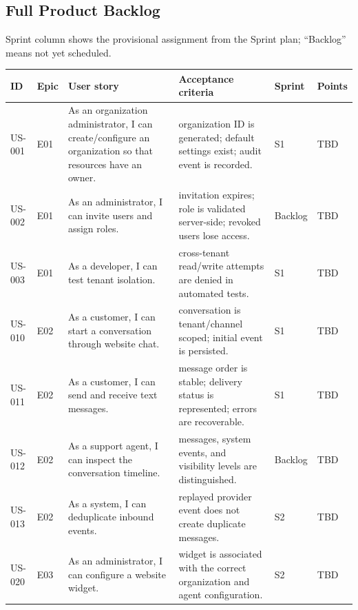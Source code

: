 \begin{lscapepage}
\section{Full Product Backlog}
Sprint column shows the provisional assignment from the Sprint plan; ``Backlog'' means not yet scheduled.
{\small
\begin{longtable}{@{}>{\raggedright\arraybackslash}p{}>{\raggedright\arraybackslash}p{}>{\raggedright\arraybackslash}p{}>{\raggedright\arraybackslash}p{}>{\raggedright\arraybackslash}p{}>{\raggedright\arraybackslash}p{}@{}}
\toprule
\textbf{ID} & \textbf{Epic} & \textbf{User story} & \textbf{Acceptance criteria} & \textbf{Sprint} & \textbf{Points} \\
\midrule
\endhead
\bottomrule
\endfoot
US-001 & E01 & As an organization administrator, I can create/configure an organization so that resources have an owner. & organization ID is generated; default settings exist; audit event is recorded. & S1 & TBD \\
US-002 & E01 & As an administrator, I can invite users and assign roles. & invitation expires; role is validated server-side; revoked users lose access. & Backlog & TBD \\
US-003 & E01 & As a developer, I can test tenant isolation. & cross-tenant read/write attempts are denied in automated tests. & S1 & TBD \\
US-010 & E02 & As a customer, I can start a conversation through website chat. & conversation is tenant/channel scoped; initial event is persisted. & S1 & TBD \\
US-011 & E02 & As a customer, I can send and receive text messages. & message order is stable; delivery status is represented; errors are recoverable. & S1 & TBD \\
US-012 & E02 & As a support agent, I can inspect the conversation timeline. & messages, system events, and visibility levels are distinguished. & Backlog & TBD \\
US-013 & E02 & As a system, I can deduplicate inbound events. & replayed provider event does not create duplicate messages. & S2 & TBD \\
US-020 & E03 & As an administrator, I can configure a website widget. & widget is associated with the correct organization and agent configuration. & S2 & TBD \\

\end{longtable}}
\end{lscapepage}
